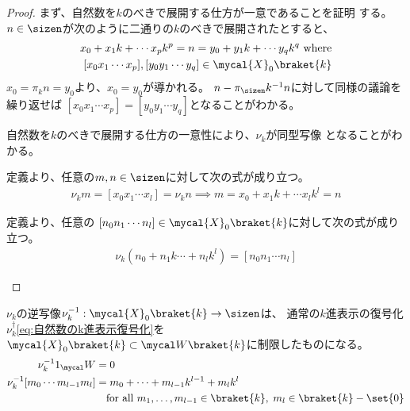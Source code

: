 	\begin{proof} まず、自然数を$k$のべきで展開する仕方が一意であることを証明
	する。$n\in\sizen$が次のように二通りの$k$のべきで展開されたとすると、
	\begin{equation*}\begin{split}
		x_0 + x_1k + \cdots x_pk^p = n = y_0 + y_1k + \cdots y_qk^q \text{ where} \\
		[x_0x_1\cdots x_p],[y_0y_1\cdots y_q]\in\mycal{X}_0\braket{k}
	\end{split}\end{equation*}
	$x_0=\pi_kn=y_0$より、$x_0=y_0$が導かれる。
	$n-\pi_\sizen k^{-1}n$に対して同様の議論を繰り返せば
	$[x_0x_1\cdots x_p]=[y_0y_1\cdots y_q]$となることがわかる。

	自然数を$k$のべきで展開する仕方の一意性により、$\nu_k$が同型写像
	となることがわかる。
		\begin{description}\setlength{\itemsep}{-1mm} %
			\item[1:1] 定義より、任意の$m,n\in\sizen$に対して次の式が成り立つ。
			\begin{equation*}\begin{split}
				\nu_km = [x_0x_1\cdots x_l] = \nu_kn 
				\implies m = x_0 + x_1k + \cdots x_lk^l = n
			\end{split}\end{equation*}
			\item[onto] 定義より、任意の
			$[n_0n_1\cdots n_l]\in\mycal{X}_0\braket{k}$に対して次の式が成り立つ。
			\begin{equation*}\begin{split}
				\nu_k(n_0 + n_1k \cdots + n_lk^l) = [n_0n_1\cdots n_l]
			\end{split}\end{equation*}
		\end{description} %
	\end{proof}
	$\nu_k$の逆写像$\nu_k^{-1}:\mycal{X}_0\braket{k}\to\sizen$は、
	通常の$k$進表示の復号化$\nu_k^\dag$\eqref{eq:自然数のk進表示復号化}を
	$\mycal{X}_0\braket{k}\subset\Word\braket{k}$に制限したものになる。
	\begin{equation*}\begin{split}
		\nu_k^{-1}1_\Word &= 0 \\
		\nu_k^{-1}[m_0\cdots m_{l-1}m_l]
			&= m_0 + \cdots + m_{l-1}k^{l-1} + m_lk^l \\
			&\quad\text{for all } m_1,\dots,m_{l-1}\in\braket{k}
			,\;m_l\in\braket{k}-\set{0} \\
	\end{split}\end{equation*}

